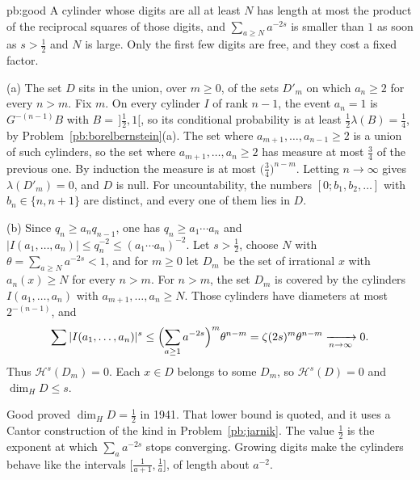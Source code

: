 \begin{solution}{pb:good}
\idea A cylinder whose digits are all at least $N$ has length at most the product of the reciprocal squares of those digits, and $\sum_{a\ge N}a^{-2s}$ is smaller than $1$ as soon as $s>\frac12$ and $N$ is large. Only the first few digits are free, and they cost a fixed factor.

\writeup (a) The set $D$ sits in the union, over $m\ge 0$, of the sets $D'_m$ on which $a_n\ge 2$ for every $n>m$. Fix $m$. On every cylinder $I$ of rank $n-1$, the event $a_n=1$ is $G^{-(n-1)}B$ with $B=\,]\frac12,1[$, so its conditional probability is at least $\frac12\lambda(B)=\frac14$, by Problem~\ref{pb:borelbernstein}(a). The set where $a_{m+1},\dots,a_{n-1}\ge 2$ is a union of such cylinders, so the set where $a_{m+1},\dots,a_n\ge 2$ has measure at most $\frac34$ of the previous one. By induction the measure is at most $\bigl(\frac34\bigr)^{n-m}$. Letting $n\to\infty$ gives $\lambda(D'_m)=0$, and $D$ is null. For uncountability, the numbers $[0;b_1,b_2,\dots]$ with $b_n\in\{n,n+1\}$ are distinct, and every one of them lies in $D$.

(b) Since $q_n\ge a_nq_{n-1}$, one has $q_n\ge a_1\cdots a_n$ and $|I(a_1,\dots,a_n)|\le q_n^{-2}\le(a_1\cdots a_n)^{-2}$. Let $s>\frac12$, choose $N$ with $\theta=\sum_{a\ge N}a^{-2s}<1$, and for $m\ge 0$ let $D_m$ be the set of irrational $x$ with $a_n(x)\ge N$ for every $n>m$. For $n>m$, the set $D_m$ is covered by the cylinders $I(a_1,\dots,a_n)$ with $a_{m+1},\dots,a_n\ge N$. Those cylinders have diameters at most $2^{-(n-1)}$, and
\[
\sum|I(a_1,\dots,a_n)|^s\le\Bigl(\sum_{a\ge 1}a^{-2s}\Bigr)^m\theta^{n-m}=\zeta(2s)^m\theta^{n-m}\xrightarrow[n\to\infty]{}0.
\]
Thus $\mathcal H^s(D_m)=0$. Each $x\in D$ belongs to some $D_m$, so $\mathcal H^s(D)=0$ and $\dim_HD\le s$.

\leads Good proved $\dim_HD=\frac12$ in 1941. That lower bound is quoted, and it uses a Cantor construction of the kind in Problem~\ref{pb:jarnik}. The value $\frac12$ is the exponent at which $\sum_a a^{-2s}$ stops converging. Growing digits make the cylinders behave like the intervals $\bigl[\frac1{a+1},\frac1a\bigr]$, of length about $a^{-2}$.
\end{solution}

